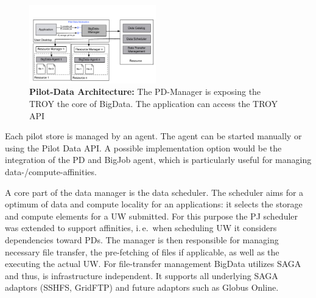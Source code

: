 \documentclass[conference,final]{IEEEtran}
\begin{document}
\begin{figure}[htbp]
    \centering
        \includegraphics[width=0.49\textwidth]{figures/pilot-data-manager.pdf}
    \caption{\textbf{Pilot-Data Architecture:} The PD-Manager is exposing the TROY the core of 
    BigData. The application can access the TROY API}
    \label{fig:pilot-data-architecture}
\end{figure}

Each pilot store is managed by an agent. The agent can be started manually or 
using the Pilot Data API. A possible implementation option would be the 
integration of the PD and BigJob agent, which is particularly useful for 
managing data-/compute-affinities.

A core part of the data manager is the data scheduler. The scheduler aims for a
optimum of data and compute locality for an applications: it selects the storage
and compute elements for a UW submitted. For this purpose the PJ scheduler was
extended to support affinities, i.\,e.\ when scheduling UW it considers
dependencies toward PDs. The manager is then responsible for managing necessary
file transfer, the pre-fetching of files if applicable, as well as the executing
the actual UW. For file-transfer management BigData utilizes SAGA and thus, is
infrastructure independent. It supports all underlying SAGA adaptors (SSHFS,
GridFTP) and future adaptors such as Globus Online.



% 
\end{document}
